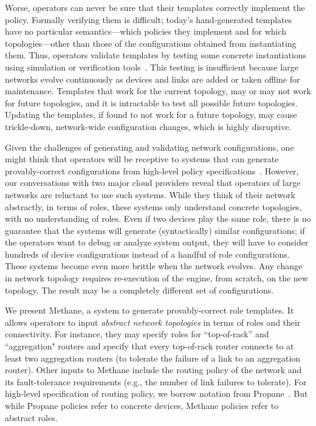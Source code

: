 \documentclass[numbers, 10pt, preprint]{sigplanconf}
\newcommand{\sysname}{{\small \sf Methane}\xspace}
\begin{document}
Worse, operators can never be sure that their templates correctly implement the policy. %
Formally verifying them is difficult; today's hand-generated templates have no particular semantics---which policies they implement and for which topologies---other than those of the configurations obtained from instantiating them.
%
Thus, operators validate templates by testing some concrete instantiations using
simulation or verification tools~\cite{feamster+:rcc, batfish, era, arc, bagpipe}. This testing is insufficient because large networks evolve continuously as
devices and links are added or taken offline for maintenance. Templates that
work for the current topology, may or may not work for future
topologies, and it is intractable to test all possible future topologies. Updating the templates, if found to not work for a future topology,
may cause trickle-down, network-wide configuration changes, which is highly
disruptive.


Given the challenges of generating and validating network configurations, one
might think that operators will be receptive to systems that can generate
provably-correct configurations from high-level policy
specifications~\cite{narain+:configassure,propane}. However, our conversations
with two major cloud providers reveal that operators of large networks are
reluctant to use such systems. While they think of their network abstractly, in
terms of roles, these systems only understand concrete topologies, with no understanding of roles.  Even if two devices play the same role,
there is no guarantee that the systems will generate (syntactically) similar
configurations; if the operators want to debug or analyze system output, they
will have to consider hundreds of device configurations instead of a handful of
role configurations. These systems become even more brittle when the network
evolves. Any change in network topology requires re-execution of the engine,
from scratch, on the new topology.  The result may be a completely different
set of configurations.

We present \sysname, a system to generate provably-correct role templates. It
allows operators to input \emph{abstract network topologies} in terms of roles
and their connectivity. For instance, they may specify roles for ``top-of-rack''
and ``aggregation" routers and specify that every top-of-rack router connects to
at least two aggregation routers (to tolerate the failure of a link to an
aggregation router). Other inputs to \sysname include the routing policy of the
network and its fault-tolerance requirements (e.g., the number of link failures
to tolerate). For high-level specification of routing policy, we borrow notation from
Propane~\cite{propane}. But while Propane policies refer to concrete devices, \sysname
policies refer to abstract roles.
\end{document}
